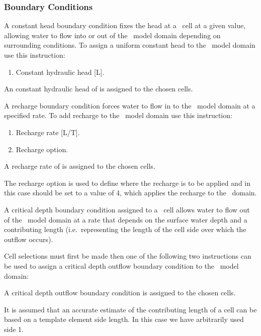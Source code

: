 \subsubsection{Boundary Conditions}  
A constant head boundary condition fixes the head at a \swf\ cell at a given value, allowing water to flow into or out of the \swf\ model domain depending on surrounding conditions.    To assign a uniform constant head to the \swf\ model domain use this instruction:

    {
        \squish
        \begin{enumerate}
        \item {}  Constant hydraulic head [L].
        \end{enumerate}
          An constant hydraulic head  of  is assigned to the chosen cells.
    }

A recharge boundary condition forces  water to flow in to the \swf\ model domain at a specified rate.   To add recharge  to the \swf\ model domain use this instruction:

    {
        \squish
        \begin{enumerate}
            \item {}  Recharge rate [L/T].
            \item {}  Recharge option.
        \end{enumerate}
        A recharge rate of  is assigned to the chosen cells.

        The recharge option  is used to define where the recharge is to be applied and in this case should be set to a value of 4, which applies the recharge to the \swf\ domain.
    }

A critical depth boundary condition assigned to a \swf\ cell allows water to flow out of the \swf\ model domain at a rate that depends on the surface water depth and a contributing length (i.e.\ representing the length of the cell side over which the outflow occurs).

Cell selections must first be made then one of the following two  instructions can be used to assign a critical depth outflow boundary condition to the \swf\ model domain:

    {
          A critical depth outflow boundary condition is assigned to the chosen cells.

          It is assumed that an accurate estimate of the contributing length of a cell can be based on a template element side length. In this case we have arbitrarily used side 1.
    }


